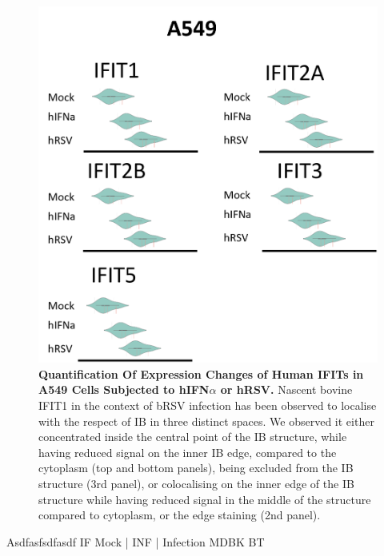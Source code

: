 \begin{figure}
    \centering
    \includegraphics[width=1\linewidth]{09. Chapter 4/Figs/01. Localisation introduction/07. a549 plots.png}
    \caption[Quantification Of Expression Changes of Human IFITs in A549 Cells Subjected to hIFN\(\alpha\) or hRSV.]{\textbf{Quantification Of Expression Changes of Human IFITs in A549 Cells Subjected to hIFN\(\alpha\) or hRSV.} Nascent bovine IFIT1 in the context of bRSV infection has been observed to localise with the respect of IB in three distinct spaces. We observed it either concentrated inside the central point of the IB structure, while having reduced signal on the inner IB edge, compared to the cytoplasm (top and bottom panels), being excluded from the IB structure (3rd panel), or colocalising on the inner edge of the IB structure while having reduced signal in the middle of the structure compared to cytoplasm, or the edge staining (2nd panel).}
    \label{fig:Quantification Of Expression Changes of Human IFITs in A549 Cells Subjected to hIFNa or hRSV.}
\end{figure}


Asdfasfsdfasdf \newline
IF Mock | INF | Infection \newline
MDBK BT

